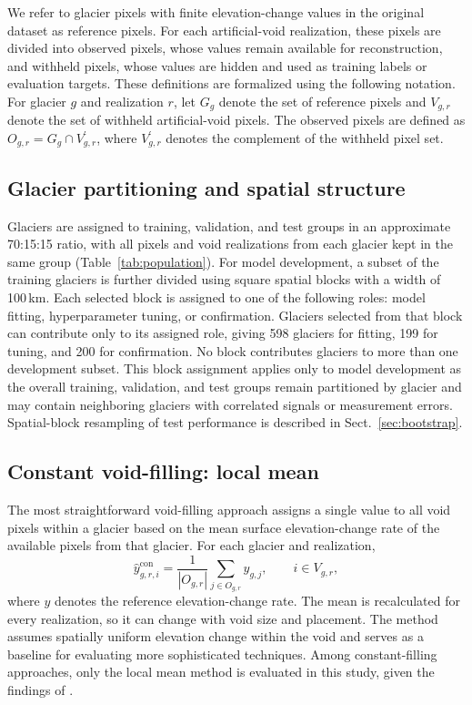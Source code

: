 \documentclass[tc,manuscript]{copernicus}
\begin{document}
We refer to glacier pixels with finite elevation-change values in the original dataset as reference pixels. For each artificial-void realization, these pixels are divided into observed pixels, whose values remain available for reconstruction, and withheld pixels, whose values are hidden and used as training labels or evaluation targets. These definitions are formalized using the following notation. For glacier $g$ and realization $r$, let $G_g$ denote the set of reference pixels and $V_{g,r}$ denote the set of withheld artificial-void pixels. The observed pixels are defined as \(O_{g,r}=G_g\cap V_{g,r}^{\prime}\), where $V_{g,r}^{\prime}$ denotes the complement of the withheld pixel set.

\subsection{Glacier partitioning and spatial structure}

Glaciers are assigned to training, validation, and test groups in an approximate 70:15:15 ratio, with all pixels and void realizations from each glacier kept in the same group (Table~\ref{tab:population}). For model development, a subset of the training glaciers is further divided using square spatial blocks with a width of 100\,km. Each selected block is assigned to one of the following roles: model fitting, hyperparameter tuning, or confirmation. Glaciers selected from that block can contribute only to its assigned role, giving 598 glaciers for fitting, 199 for tuning, and 200 for confirmation. No block contributes glaciers to more than one development subset. This block assignment applies only to model development as the overall training, validation, and test groups remain partitioned by glacier and may contain neighboring glaciers with correlated signals or measurement errors. Spatial-block resampling of test performance is described in Sect.~\ref{sec:bootstrap}.

\subsection{Constant void-filling: local mean}
The most straightforward void-filling approach assigns a single value to all void pixels within a glacier based on the mean surface elevation-change rate of the available pixels from that glacier. For each glacier and realization,
\begin{equation}
\widehat y^{\mathrm{con}}_{g,r,i}=\frac{1}{|O_{g,r}|}\sum_{j\in O_{g,r}}y_{g,j},\qquad i\in V_{g,r},
\end{equation}
where $y$ denotes the reference elevation-change rate. The mean is recalculated for every realization, so it can change with void size and placement. The method assumes spatially uniform elevation change within the void and serves as a baseline for evaluating more sophisticated techniques. Among constant-filling approaches, only the local mean method is evaluated in this study, given the findings of \citet{mcnabb2019}.
\end{document}
